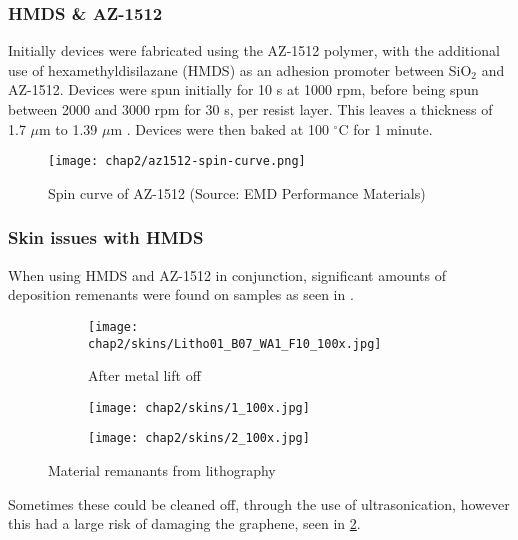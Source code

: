 \documentclass[../Matt_Gebert_Honours_Thesis.tex]{subfiles}
\begin{document}
	\subsubsection{HMDS \& AZ-1512}
		Initially devices were fabricated using the AZ-1512 polymer, with the additional use of hexamethyldisilazane (HMDS) as an adhesion promoter between SiO$_2$ and AZ-1512. Devices were spun initially for 10 s at 1000 rpm, before being spun between 2000 and 3000 rpm for 30 s, per resist layer. This leaves a thickness of 1.7 $\mu$m to 1.39 $\mu$m \cite{az1500_series}.
		Devices were then baked at 100 $^\circ$C for 1 minute.
	
	\begin{figure}[H]\label{fig:spin_curve_AZ-1512}
		\centering
		\texttt{[image: chap2/az1512-spin-curve.png]}
		\caption{Spin curve of AZ-1512 (Source: EMD Performance Materials\cite{az1500_series_spincurve})}
	\end{figure}
	
	\subsubsection{Skin issues with HMDS}
	When using HMDS and AZ-1512 in conjunction, significant amounts of deposition remenants were found on samples as seen in . 
	
	\begin{figure}[H]
		\centering
		\begin{subfigure}[b]{0.3\textwidth}
			\texttt{[image: chap2/skins/Litho01\_B07\_WA1\_F10\_100x.jpg]}
			\caption{After metal lift off}			
		\end{subfigure}
		\begin{subfigure}[b]{0.3\textwidth}
			\texttt{[image: chap2/skins/1\_100x.jpg]}
		\end{subfigure}
		\begin{subfigure}[b]{0.3\textwidth}
			\texttt{[image: chap2/skins/2\_100x.jpg]}
		\end{subfigure}
		\caption{Material remanants from lithography}\label{fig:lithography_skins}
	\end{figure}
	
	Sometimes these could be cleaned off, through the use of ultrasonication, however this had a large risk of damaging the graphene, seen in \cref{fig:lithography_skins}.
	
\end{document}
